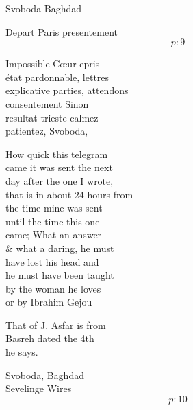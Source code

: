 \documentclass{report}
\begin{document}
	\par{
 	Svoboda Baghdad\ \\
	}

	\par{
 	Depart Paris presentement\ \\
  \[p: 9 \]

	}



	\par{
 	Impossible Cœur epris\ \\état pardonnable, lettres\ \\explicative parties, attendons\ \\consentement Sinon\ \\resultat trieste calmez\ \\patientez, Svoboda,\ \\
	}

	\par{
 	How quick this telegram\ \\came it was sent the next\ \\day after the one I wrote,\ \\that is in about 24 hours from\ \\the time mine was sent\ \\until the time this one\ \\came; What an answer\ \\\& what a daring, he must\ \\have lost his head and\ \\he must have been taught\ \\by the woman he loves\ \\or by Ibrahim Gejou\ \\
	}

	\par{
 	That of J. Asfar is from\ \\Basreh dated the 4th\ \\he says.\ \\
	}

	\par{
 	Svoboda, Baghdad\ \\Sevelinge Wires\ \\
  \[p: 10 \]

	}

\end{document}
